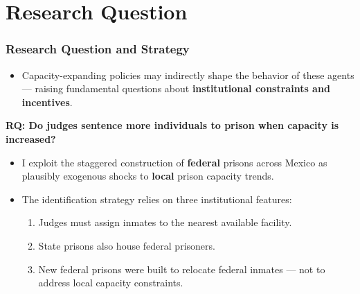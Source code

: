\documentclass[10pt,aspectratio=169]{beamer}
\begin{document}
\section{Research Question}
\begin{frame}
\frametitle{Research Question and Strategy}
\small
\begin{itemize}\setlength\itemsep{0.65em}
    \item Capacity-expanding policies may indirectly shape the behavior of these agents — raising fundamental questions about \textbf{institutional constraints and incentives}.
\end{itemize}

\pause
\vspace{0.5em}
\begin{center}
    \normalsize \textbf{RQ: Do judges sentence more individuals to prison when capacity is increased?}
\end{center}
\vspace{0.5em}

\pause

\begin{itemize}\setlength\itemsep{0.65em}
    \item I exploit the staggered construction of \textbf{federal} prisons across Mexico as plausibly exogenous shocks to \textbf{local} prison capacity trends.
    \pause
    \item The identification strategy relies on three institutional features: 
    \begin{enumerate}\setlength\itemsep{0.65em}
        \item Judges must assign inmates to the nearest available facility.\pause
        \item State prisons also house federal prisoners.\pause
        \item New federal prisons were built to relocate federal inmates — not to address local capacity constraints.
    \end{enumerate}
\end{itemize}
\end{frame}
\end{document}
